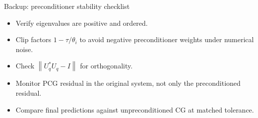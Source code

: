 \documentclass[aspectratio=169,10pt]{beamer}
\newcommand{\norm}[1]{\left\lVert #1 \right\rVert}
\begin{document}
\begin{frame}{Backup: preconditioner stability checklist}
\begin{itemize}
  \item Verify eigenvalues are positive and ordered.
  \item Clip factors $1-\tau/\theta_i$ to avoid negative preconditioner weights under numerical noise.
  \item Check $\norm{U_q^*U_q-I}$ for orthogonality.
  \item Monitor PCG residual in the original system, not only the preconditioned residual.
  \item Compare final predictions against unpreconditioned CG at matched tolerance.
\end{itemize}
\end{frame}
\end{document}
